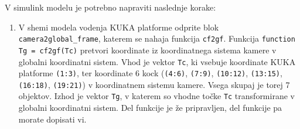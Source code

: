 \begin{mdframed}[backgroundcolor=yellow!20, shadow=true,roundcorner=8pt]

V simulink modelu je potrebno napraviti naslednje korake:

\begin{enumerate}

\item V shemi modela vodenja KUKA platforme odprite blok \verb"camera2global_frame", katerem se nahaja funkcija \verb"cf2gf". Funkcija \newline \verb"function Tg = cf2gf(Tc)" pretvori koordinate iz koordinatnega sistema kamere v globalni koordinatni sistem. Vhod je vektor \verb"Tc", ki vsebuje koordinate KUKA platforme \verb"(1:3)", ter koordinate 6 kock (\verb"(4:6)", \verb"(7:9)", \verb"(10:12)", \verb"(13:15)", \verb"(16:18)", \verb"(19:21)") v koordinatnem sistemu kamere. Vsega skupaj je torej 7 objektov. Izhod je vektor \verb"Tg", v katerem so vhodne točke \verb"Tc" transformirane v globalni koordinatni sistem. Del funkcije je že pripravljen, del funkcije pa morate dopisati vi.


\end{enumerate}
\end{mdframed}
